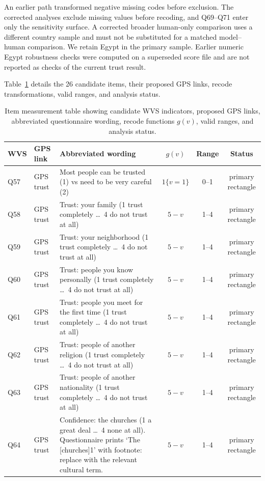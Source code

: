 An earlier path transformed negative missing codes before exclusion. The corrected analyses exclude missing values before recoding, and Q69--Q71 enter only the sensitivity surface. A corrected broader human-only comparison uses a different country sample and must not be substituted for a matched model--human comparison. We retain Egypt in the primary sample. Earlier numeric Egypt robustness checks were computed on a superseded score file and are not reported as checks of the current trust result.

Table~\ref{tab:items} details the 26 candidate items, their proposed GPS links, recode transformations, valid ranges, and analysis status.

\begin{table}[p]\centering\tiny\renewcommand{\arraystretch}{0.95}\setlength{\tabcolsep}{3pt}
\caption{Item measurement table showing candidate WVS indicators, proposed GPS links, abbreviated questionnaire wording, recode functions $g(v)$, valid ranges, and analysis status.}\label{tab:items}
\begin{tabularx}{\textwidth}{llXccc}\toprule
WVS & GPS link & Abbreviated wording & $g(v)$ & Range & Status \\\midrule
Q57 & GPS trust & Most people can be trusted (1) vs need to be very careful (2) & $1\{v=1\}$ & 0--1 & primary rectangle \\
Q58 & GPS trust & Trust: your family (1 trust completely \dots\ 4 do not trust at all) & $5-v$ & 1--4 & primary rectangle \\
Q59 & GPS trust & Trust: your neighborhood (1 trust completely \dots\ 4 do not trust at all) & $5-v$ & 1--4 & primary rectangle \\
Q60 & GPS trust & Trust: people you know personally (1 trust completely \dots\ 4 do not trust at all) & $5-v$ & 1--4 & primary rectangle \\
Q61 & GPS trust & Trust: people you meet for the first time (1 trust completely \dots\ 4 do not trust at all) & $5-v$ & 1--4 & primary rectangle \\
Q62 & GPS trust & Trust: people of another religion (1 trust completely \dots\ 4 do not trust at all) & $5-v$ & 1--4 & primary rectangle \\
Q63 & GPS trust & Trust: people of another nationality (1 trust completely \dots\ 4 do not trust at all) & $5-v$ & 1--4 & primary rectangle \\
Q64 & GPS trust & Confidence: the churches (1 a great deal \dots\ 4 none at all). Questionnaire prints `The [churches]1' with footnote: replace with the relevant cultural term. & $5-v$ & 1--4 & primary rectangle \\

\end{tabularx}
\end{table}
